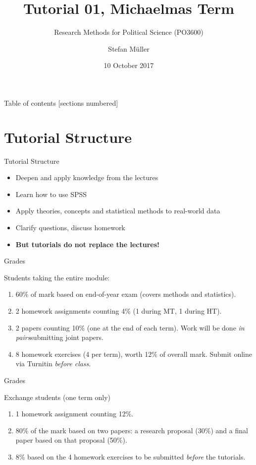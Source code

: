 \documentclass[10pt]{beamer}
\title{Tutorial 01, Michaelmas Term}
\subtitle{Research Methods for Political Science (PO3600)}
\date{10 October 2017}
\author{Stefan Müller}
\institute{Trinity College Dublin \\ \url{http://muellerstefan.net/research-methods}}
\begin{document}
\maketitle

\begin{frame}{Table of contents}
  [sections numbered]
  \tableofcontents%
\end{frame}

\section{Tutorial Structure}
\begin{frame}{Tutorial Structure}

\begin{itemize}
\item Deepen and apply knowledge from the lectures
\item Learn how to use SPSS
\item Apply theories, concepts and statistical methods to real-world data
\item Clarify questions, discuss homework
\item \textbf{But tutorials do not replace the lectures!}
\end{itemize}

\end{frame}

\begin{frame}{Grades}

Students taking the entire module:

\begin{enumerate}
\item 60\% of mark based on end-of-year exam (covers methods and statistics).
\item 2 homework assignments counting 4\% (1 during MT, 1 during HT).
\item 2 papers counting 10\% (one at the end of each term). Work will be done \textit{in pairs}submitting joint papers.
\item 8 homework exercises (4 per term), worth 12\% of overall mark. Submit online via Turnitin \textit{before class}.
\end{enumerate}
\end{frame}
\begin{frame}{Grades}

Exchange students (one term only)
\begin{enumerate}
\item 1 homework assignment counting 12\%.
\item 80\% of the mark based on two papers: a research proposal (30\%) and a final paper based on that proposal (50\%).
\item 8\% based on the 4 homework exercises to be submitted \textit{before} the tutorials.
\end{enumerate}
\end{frame}
\end{document}
